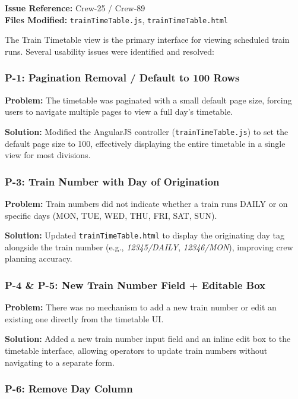 \documentclass[12pt,a4paper]{article}
\begin{document}
\textbf{Issue Reference:} Crew-25 / Crew-89 \\
\textbf{Files Modified:} \texttt{trainTimeTable.js}, \texttt{trainTimeTable.html}

The Train Timetable view is the primary interface for viewing scheduled train
runs. Several usability issues were identified and resolved:

\subsubsection{P-1: Pagination Removal / Default to 100 Rows}

\textbf{Problem:} The timetable was paginated with a small default page size,
forcing users to navigate multiple pages to view a full day's timetable.

\textbf{Solution:} Modified the AngularJS controller (\texttt{trainTimeTable.js})
to set the default page size to 100, effectively displaying the entire
timetable in a single view for most divisions.

\subsubsection{P-3: Train Number with Day of Origination}

\textbf{Problem:} Train numbers did not indicate whether a train runs DAILY or
on specific days (MON, TUE, WED, THU, FRI, SAT, SUN).

\textbf{Solution:} Updated \texttt{trainTimeTable.html} to display the
originating day tag alongside the train number (e.g., \textit{12345/DAILY},
\textit{12346/MON}), improving crew planning accuracy.

\subsubsection{P-4 \& P-5: New Train Number Field + Editable Box}

\textbf{Problem:} There was no mechanism to add a new train number or edit an
existing one directly from the timetable UI.

\textbf{Solution:} Added a new train number input field and an inline edit box
to the timetable interface, allowing operators to update train numbers without
navigating to a separate form.

\subsubsection{P-6: Remove Day Column}
\end{document}

